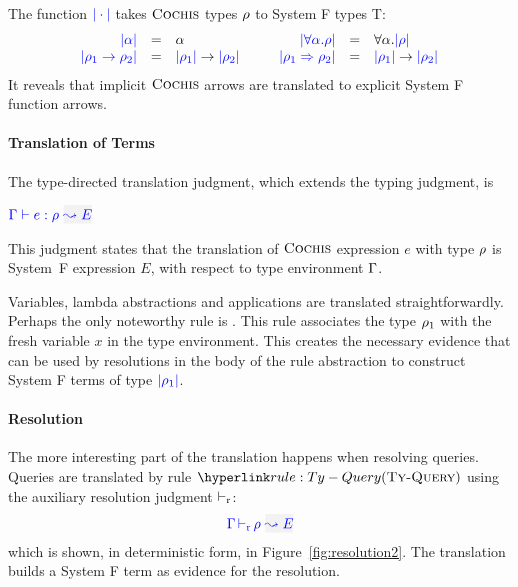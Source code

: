 The function $\ttrans$ takes 
$\name$ types $\rulet$ to System F types T: 
\begin{equation*}
\begin{array}{rcl@{\hspace{1cm}}rcl}
\ttrans[\alpha] & = & \alpha &
\ttrans[\forall \alpha. \rulet] & = & \forall \alpha. \ttrans[\rulet] \\
\ttrans[\rulet_1 \arrow \rulet_2] & = & \ttrans[\rulet_1] \arrow \ttrans[\rulet_2] &
\ttrans[\rulet_1 \iarrow \rulet_2] & = & \ttrans[\rulet_1] \arrow \ttrans[\rulet_2] %
\end{array}
\end{equation*}
It reveals that implicit $\name$ arrows are translated to explicit System F function arrows.

\paragraph{Translation of Terms}

The type-directed translation judgment, which extends the typing judgment, is 
\begin{center}
  $\wte{\tenv}{e}{\rulet}{E}$
\end{center}
This judgment states that the translation of $\name$ expression $e$ with
type $\rulet$ is System~F expression $E$, with respect to type environment
$\tenv$.

Variables, lambda abstractions and applications
are translated straightforwardly. Perhaps the only noteworthy 
rule is . This rule associates the type $\rulet_1$ with 
the fresh variable $x$ in the type environment. 
This creates the necessary evidence that can be used by resolutions 
in the body of the rule abstraction to construct System F terms of type $\ttrans[\rulet_1]$. 

\paragraph{Resolution}
The more interesting part of the translation happens when resolving queries.
Queries are translated by rule $\rref{Ty-Query}$ using the auxiliary resolution
judgment $\ivturns$:
\begin{equation*}
\dres{\tenv}{\rulet}{E}
\end{equation*}
which is shown, in deterministic form, in Figure~\ref{fig:resolution2}.  The
translation builds a System F term as evidence for the resolution.  

